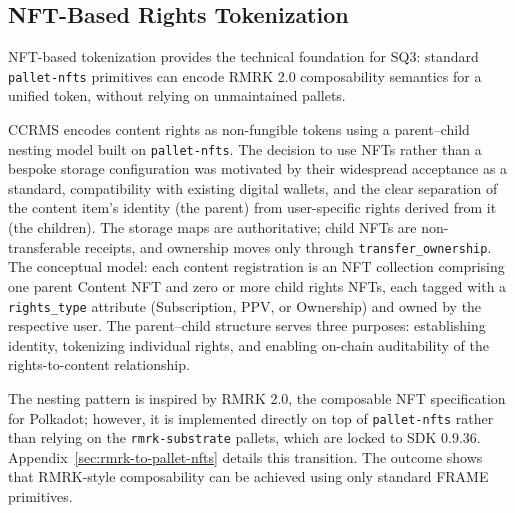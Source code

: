 \subsection{NFT-Based Rights Tokenization}\label{subsec:nft-tokenization}

NFT-based tokenization provides the technical foundation for SQ3: standard \texttt{pallet-nfts} primitives can encode RMRK 2.0 composability semantics for a unified token, without relying on unmaintained pallets.

CCRMS encodes content rights as non-fungible tokens using a parent--child nesting model built on \texttt{pallet-nfts}. The decision to use NFTs rather than a bespoke storage configuration was motivated by their widespread acceptance as a standard, compatibility with existing digital wallets, and the clear separation of the content item's identity (the parent) from user-specific rights derived from it (the children). The storage maps are authoritative; child NFTs are non-transferable receipts, and ownership moves only through \texttt{transfer\_ownership}.
The conceptual model: each content registration is an NFT collection comprising one parent Content NFT and zero or more child rights NFTs, each tagged with a \texttt{rights\_type} attribute (Subscription, PPV, or Ownership) and owned by the respective user. The parent--child structure serves three purposes: establishing identity, tokenizing individual rights, and enabling on-chain auditability of the rights-to-content relationship.

The nesting pattern is inspired by RMRK 2.0, the composable NFT specification for Polkadot; however, it is implemented directly on top of \texttt{pallet-nfts} rather than relying on the \texttt{rmrk-substrate} pallets, which are locked to SDK 0.9.36. Appendix~\ref{sec:rmrk-to-pallet-nfts} details this transition. The outcome shows that RMRK-style composability can be achieved using only standard FRAME primitives.

